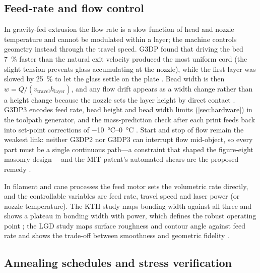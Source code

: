 \subsection{Feed-rate and flow control}
In gravity-fed extrusion the flow rate is a slow function of head and nozzle temperature and cannot be modulated within a layer; the machine controls geometry instead through the travel speed. G3DP found that driving the bed \SI{7}{\percent} faster than the natural exit velocity produced the most uniform cord (the slight tension prevents glass accumulating at the nozzle), while the first layer was slowed by \SI{25}{\percent} to let the glass settle on the plate \citep{klein2015}. Bead width is then \(w = Q/(v_{\mathrm{travel}} h_{\mathrm{layer}})\), and any flow drift appears as a width change rather than a height change because the nozzle sets the layer height by direct contact \citep{klein2015}. G3DP3 encodes feed rate, bead height and bead width limits (\cref{sec:hardware}) in the toolpath generator, and the mass-prediction check after each print feeds back into set-point corrections of \SIrange{-10}{0}{\celsius} \citep{stern2024cgc}. Start and stop of flow remain the weakest link: neither G3DP2 nor G3DP3 can interrupt flow mid-object, so every part must be a single continuous path---a constraint that shaped the figure-eight masonry design \citep{mit2024masonry}---and the MIT patent's automated shears are the proposed remedy \citep{patent_us9919510}.

In filament and cane processes the feed motor sets the volumetric rate directly, and the controllable variables are feed rate, travel speed and laser power (or nozzle temperature). The KTH study maps bonding width against all three and shows a plateau in bonding width with power, which defines the robust operating point \citep{kth2022bonding}; the LGD study maps surface roughness and contour angle against feed rate and shows the trade-off between smoothness and geometric fidelity \citep{lgd2024homog}.

\subsection{Annealing schedules and stress verification}
